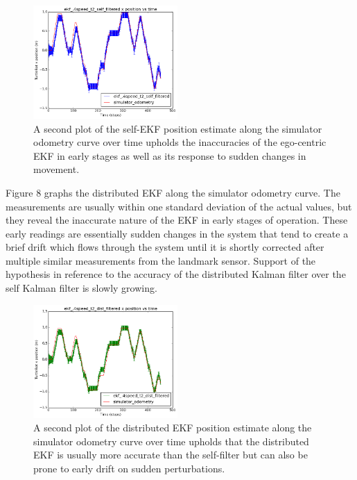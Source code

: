 \documentclass[conference]{IEEEtran} \usepackage[T1]{fontenc} \usepackage[backend=biber, style=ieee]{biblatex}
\begin{document}
\begin{figure}
\centering 
\includegraphics[width=0.49\textwidth]{ekf_4speed_t2_self_filtered_pos_err_graph}
\caption {A second plot of the self-EKF position estimate along the simulator odometry curve over time 
upholds the inaccuracies of the ego-centric EKF in early stages as well as its response to sudden changes 
in movement.}
\label{pic7} 
\end{figure}

Figure 8 graphs the distributed EKF along the simulator odometry curve. The measurements are usually within one standard 
deviation of the actual values, but they reveal the inaccurate nature of the EKF in early stages of operation. These early readings 
are essentially sudden changes in the system that tend to create a brief drift which flows through the system until it is shortly 
corrected after multiple similar measurements from the landmark sensor. Support of the hypothesis in reference to the accuracy 
of the distributed Kalman filter over the self Kalman filter is slowly growing.

\begin{figure}
\centering 
\includegraphics[width=0.49\textwidth]{ekf_4speed_t2_dist_filtered_pos_err_graph}
\caption {A second plot of the distributed EKF position estimate along the simulator odometry curve over time 
upholds that the distributed EKF is usually more accurate than the self-filter but can also be prone to early drift on sudden 
perturbations.}
\label{pic8} 
\end{figure}
\end{document}
